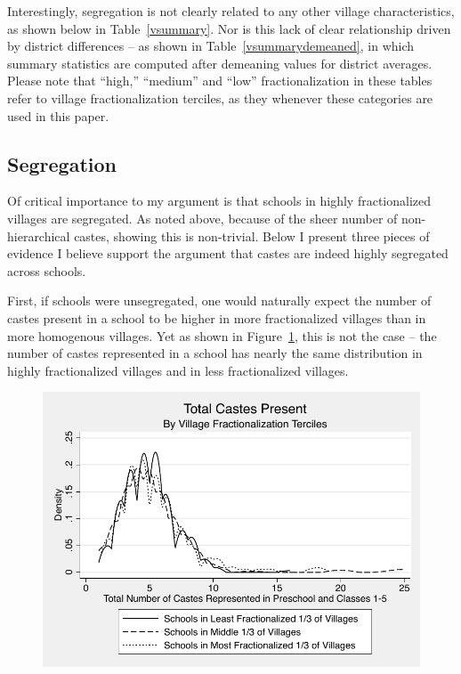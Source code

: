 \documentclass[12pt]{article}
\begin{document}
Interestingly, segregation is not clearly related to any other village characteristics, as shown below in Table~\ref{vsummary}. Nor is this lack of clear relationship driven by district differences -- as shown in Table~\ref{vsummarydemeaned}, in which summary statistics are computed after demeaning values for district averages. Please note that ``high,'' ``medium'' and ``low'' fractionalization in these tables refer to village fractionalization terciles, as they whenever these categories are used in this paper. 






\subsection{Segregation}\label{}

Of critical importance to my argument is that schools in highly fractionalized villages are segregated. As noted above, because of the sheer number of non-hierarchical castes, showing this is non-trivial. Below I present three pieces of evidence I believe support the argument that castes are indeed highly segregated across schools. 

First, if schools were unsegregated, one would naturally expect the number of castes present in a school to be higher in more fractionalized villages than in more homogenous villages. Yet as shown in Figure~\ref{numcastes}, this is not the case -- the number of castes represented in a school has nearly the same distribution in highly fractionalized villages and in less fractionalized villages. 


\begin{figure}[H]
	\begin{center}
	\caption{}\label{numcastes}
	\includegraphics[scale=1.0]{graphs/totalpresent.pdf}
	\end{center}
\end{figure}
\end{document}
